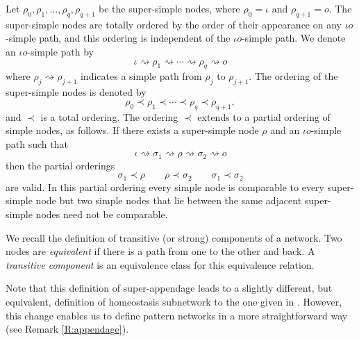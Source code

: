 \documentclass[a4paper,fleqn]{cas-dc}
\newcommand{\END}{\hfill\mbox{\raggedright \mbox{\raisebox{2pt}{\scalebox{0.6}{$\Diamond$}}}}\medskip}
\newcommand{\pathto}{\rightsquigarrow}
\begin{document}
Let $\rho_0, \rho_1, \ldots, \rho_q, \rho_{q+1}$ be the super-simple nodes, where $\rho_0 = \iota$ and $\rho_{q+1} = o$.
The super-simple nodes are totally ordered by the order of their appearance on any $\iota o$-simple path, and this ordering is independent of the $\iota o$-simple path.  We denote
an $\iota o$-simple path by 
\[
\iota \pathto \rho_1 \pathto \cdots \pathto \rho_q \pathto o  
\]
where $\rho_j\pathto\rho_{j+1}$ indicates a simple path from $\rho_j$ to $\rho_{j+1}$. 
The ordering of the super-simple nodes is denoted by  
\[
\rho_0 \prec \rho_1 \prec \cdots \prec \rho_q \prec \rho_{q+1},
\]
and $\prec$ is a total ordering. 
The ordering $\prec$ extends to a partial ordering of simple nodes, as follows. 
If there exists a super-simple node $\rho$ and an $\iota o$-simple path such that 
\[
\iota \pathto \sigma_1 \pathto \rho \pathto \sigma_2 \pathto o
\]
then the partial orderings 
\[
\sigma_1 \prec \rho \qquad \rho \prec \sigma_2 \qquad \sigma_1 \prec \sigma_2
\]
are valid. In this partial ordering every simple node is comparable to every super-simple node 
but two simple nodes that lie between the same adjacent super-simple nodes need not be 
comparable.  


We recall the definition of transitive (or strong) components of a network. Two nodes are {\em equivalent} if there is a path from one to the other and back. A {\em transitive component} is an equivalence class for this equivalence relation.

\begin{definition}\label{defn:super_appendage}
\end{definition} 

Note that this definition of super-appendage leads to a slightly different, but equivalent, definition of homeostasis subnetwork to the one given in \cite{wang2021}. 
However, this change enables us to define pattern networks in a more straightforward way (see Remark \ref{R:appendage}).
\end{document}
